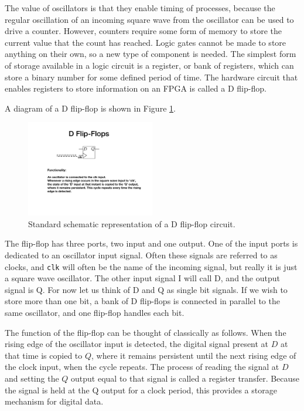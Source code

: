 \documentclass[../physical_computing.tex]{subfiles}
\begin{document}
The value of oscillators is that they enable timing of processes, because the regular oscillation of an incoming square wave from the oscillator can be used to drive a counter. However, counters require some form of memory to store the current value that the count has reached. Logic gates cannot be made to store anything on their own, so a new type of component is needed. The simplest form of storage available in a logic circuit is a register, or bank of registers, which can store a binary number for some defined period of time. The hardware circuit that enables registers to store information on an FPGA is called a D flip-flop. 

A diagram of a D flip-flop is shown in Figure
\ref{fig:dflipflop}.

\begin{figure}[htbp]
    \centering
    \includegraphics[width=0.5\textwidth]{chapter_2/figures/d_flip_flop_open.pdf}
    \caption{Standard schematic representation of a  D flip-flop circuit.}
    \label{fig:dflipflop}
\end{figure}

The flip-flop has three ports, two input and one output. One of the input ports is dedicated to an oscillator input signal. Often these signals are referred to as clocks, and \texttt{clk} will often be the name of the incoming signal, but really it is just a square wave oscillator. The other input signal I will call D, and the output signal is Q. For now let us think of D and Q as single bit signals. If we wish to store more than one bit, a bank of D flip-flops is connected in parallel to the same oscillator, and one flip-flop handles each bit.

The function of the flip-flop can be thought of classically as follows. When the rising edge of the oscillator input is detected, the digital signal present at $D$ at that time is copied to $Q$, where it remains persistent until the next rising edge of the clock input, when the cycle repeats. The process of reading the signal at $D$ and setting the $Q$ output equal to that signal is called a register transfer. Because the signal is held at the Q output for a clock period, this provides a storage mechanism for digital data.
\end{document}
